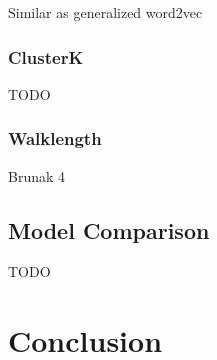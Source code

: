 Similar as generalized word2vec

\subsubsection*{ClusterK}

TODO

\subsubsection*{Walklength}

Brunak 4


\subsection{Model Comparison}

TODO

\section{Conclusion}





